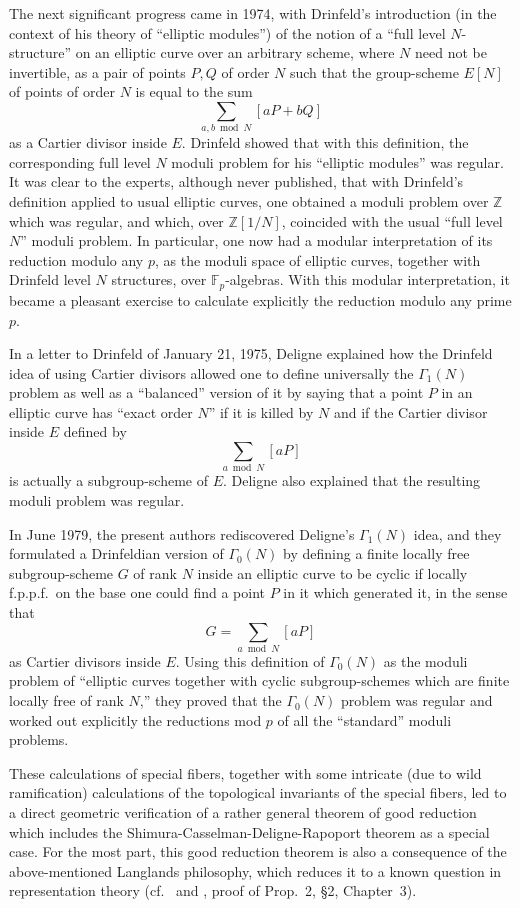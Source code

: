 The next significant progress came in 1974, with Drinfeld's introduction (in the context of his theory of ``elliptic modules'') of the notion of a ``full level $N$-structure'' on an elliptic curve over an arbitrary scheme, where $N$ need not be invertible, as a pair of points $P, Q$ of order $N$ such that the group-scheme $E[N]$ of points of order $N$ is equal to the sum
\[
\sum_{a,b \bmod N} [aP + bQ]
\]
as a Cartier divisor inside $E$. Drinfeld showed that with this definition, the corresponding full level $N$ moduli problem for his ``elliptic modules'' was regular. It was clear to the experts, although never published, that with Drinfeld's definition applied to usual elliptic curves, one obtained a moduli problem over $\mathbb{Z}$ which was regular, and which, over $\mathbb{Z}[1/N]$, coincided with the usual ``full level $N$'' moduli problem. In particular, one now had a modular interpretation of its reduction modulo any $p$, as the moduli space of elliptic curves, together with Drinfeld level $N$ structures, over $\mathbb{F}_p$-algebras. With this modular interpretation, it became a pleasant exercise to calculate explicitly the reduction modulo any prime $p$.

In a letter to Drinfeld of January 21, 1975, Deligne explained how the Drinfeld idea of using Cartier divisors allowed one to define universally the $\Gamma_1(N)$ problem as well as a ``balanced'' version of it by saying that a point $P$ in an elliptic curve has ``exact order $N$'' if it is killed by $N$ and if the Cartier divisor inside $E$ defined by
\[
\sum_{a \bmod N} [aP]
\]
is actually a subgroup-scheme of $E$. Deligne also explained that the resulting moduli problem was regular.

In June 1979, the present authors rediscovered Deligne's $\Gamma_1(N)$ idea, and they formulated a Drinfeldian version of $\Gamma_0(N)$ by defining a finite locally free subgroup-scheme $G$ of rank $N$ inside an elliptic curve to be cyclic if locally f.p.p.f.\ on the base one could find a point $P$ in it which generated it, in the sense that
\[
G = \sum_{a \bmod N} [aP]
\]
as Cartier divisors inside $E$. Using this definition of $\Gamma_0(N)$ as the moduli problem of ``elliptic curves together with cyclic subgroup-schemes which are finite locally free of rank $N$,'' they proved that the $\Gamma_0(N)$ problem was regular and worked out explicitly the reductions mod $p$ of all the ``standard'' moduli problems.

These calculations of special fibers, together with some intricate (due to wild ramification) calculations of the topological invariants of the special fibers, led to a direct geometric verification of a rather general theorem of good reduction which includes the Shimura-Casselman-Deligne-Rapoport theorem as a special case. For the most part, this good reduction theorem is also a consequence of the above-mentioned Langlands philosophy, which reduces it to a known question in representation theory (cf.\ \cite{La} and \cite{MW}, proof of Prop.~2, \S2, Chapter~3).

